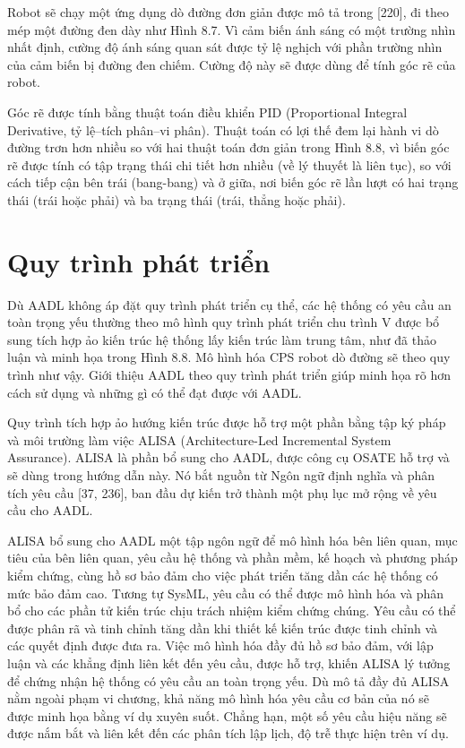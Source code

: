 Robot sẽ chạy một ứng dụng dò đường đơn giản được mô tả trong [220], đi theo mép một đường đen dày như Hình 8.7. Vì cảm biến ánh sáng có một trường nhìn nhất định, cường độ ánh sáng quan sát được tỷ lệ nghịch với phần trường nhìn của cảm biến bị đường đen chiếm. Cường độ này sẽ được dùng để tính góc rẽ của robot.

Góc rẽ được tính bằng thuật toán điều khiển PID (Proportional Integral Derivative, tỷ lệ--tích phân--vi phân). Thuật toán có lợi thế đem lại hành vi dò đường trơn hơn nhiều so với hai thuật toán đơn giản trong Hình 8.8, vì biến góc rẽ được tính có tập trạng thái chi tiết hơn nhiều (về lý thuyết là liên tục), so với cách tiếp cận bên trái (bang-bang) và ở giữa, nơi biến góc rẽ lần lượt có hai trạng thái (trái hoặc phải) và ba trạng thái (trái, thẳng hoặc phải).


\section{Quy trình phát triển}
Dù AADL không áp đặt quy trình phát triển cụ thể, các hệ thống có yêu cầu an toàn trọng yếu thường theo mô hình quy trình phát triển chu trình V được bổ sung tích hợp ảo kiến trúc hệ thống lấy kiến trúc làm trung tâm, như đã thảo luận và minh họa trong Hình 8.8. Mô hình hóa CPS robot dò đường sẽ theo quy trình như vậy. Giới thiệu AADL theo quy trình phát triển giúp minh họa rõ hơn cách sử dụng và những gì có thể đạt được với AADL.

Quy trình tích hợp ảo hướng kiến trúc được hỗ trợ một phần bằng tập ký pháp và môi trường làm việc ALISA (Architecture-Led Incremental System Assurance). ALISA là phần bổ sung cho AADL, được công cụ OSATE hỗ trợ và sẽ dùng trong hướng dẫn này. Nó bắt nguồn từ Ngôn ngữ định nghĩa và phân tích yêu cầu [37, 236], ban đầu dự kiến trở thành một phụ lục mở rộng về yêu cầu cho AADL.

ALISA bổ sung cho AADL một tập ngôn ngữ để mô hình hóa bên liên quan, mục tiêu của bên liên quan, yêu cầu hệ thống và phần mềm, kế hoạch và phương pháp kiểm chứng, cùng hồ sơ bảo đảm cho việc phát triển tăng dần các hệ thống có mức bảo đảm cao. Tương tự SysML, yêu cầu có thể được mô hình hóa và phân bổ cho các phần tử kiến trúc chịu trách nhiệm kiểm chứng chúng. Yêu cầu có thể được phân rã và tinh chỉnh tăng dần khi thiết kế kiến trúc được tinh chỉnh và các quyết định được đưa ra. Việc mô hình hóa đầy đủ hồ sơ bảo đảm, với lập luận và các khẳng định liên kết đến yêu cầu, được hỗ trợ, khiến ALISA lý tưởng để chứng nhận hệ thống có yêu cầu an toàn trọng yếu. Dù mô tả đầy đủ ALISA nằm ngoài phạm vi chương, khả năng mô hình hóa yêu cầu cơ bản của nó sẽ được minh họa bằng ví dụ xuyên suốt. Chẳng hạn, một số yêu cầu hiệu năng sẽ được nắm bắt và liên kết đến các phân tích lập lịch, độ trễ thực hiện trên ví dụ.

